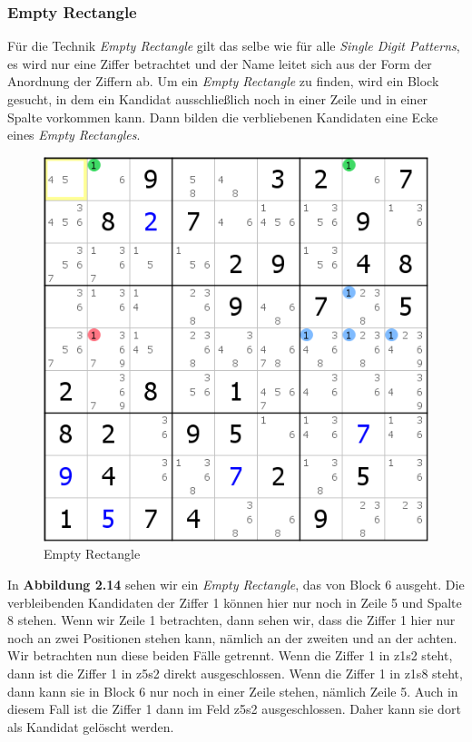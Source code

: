 \newpage
\subsubsection{Empty Rectangle}
Für die Technik \textit{Empty Rectangle} gilt das selbe wie für alle \textit{Single Digit Patterns}, es wird nur eine Ziffer betrachtet und der Name leitet sich aus der Form der Anordnung der Ziffern ab. Um ein \textit{Empty Rectangle} zu finden, wird ein Block gesucht, in dem ein Kandidat ausschließlich noch in einer Zeile und in einer Spalte vorkommen kann. Dann bilden die verbliebenen Kandidaten eine Ecke eines \textit{Empty Rectangles}.

\begin{figure}[h]
\begin{center}
\includegraphics{./img/empty_rectangle.png}
\caption{Empty Rectangle}
\end{center}
\end{figure}

In \textbf{Abbildung 2.14} sehen wir ein \textit{Empty Rectangle}, das von Block 6 ausgeht. Die verbleibenden Kandidaten der Ziffer 1 können hier nur noch in Zeile 5 und Spalte 8 stehen. Wenn wir Zeile 1 betrachten, dann sehen wir, dass die Ziffer 1 hier nur noch an zwei Positionen stehen kann, nämlich an der zweiten und an der achten. Wir betrachten nun diese beiden Fälle getrennt. Wenn die Ziffer 1 in z1s2 steht, dann ist die Ziffer 1 in z5s2 direkt ausgeschlossen. Wenn die Ziffer 1 in z1s8 steht, dann kann sie in Block 6 nur noch in einer Zeile stehen, nämlich Zeile 5. Auch in diesem Fall ist die Ziffer 1 dann im Feld z5s2 ausgeschlossen. Daher kann sie dort als Kandidat gelöscht werden.
